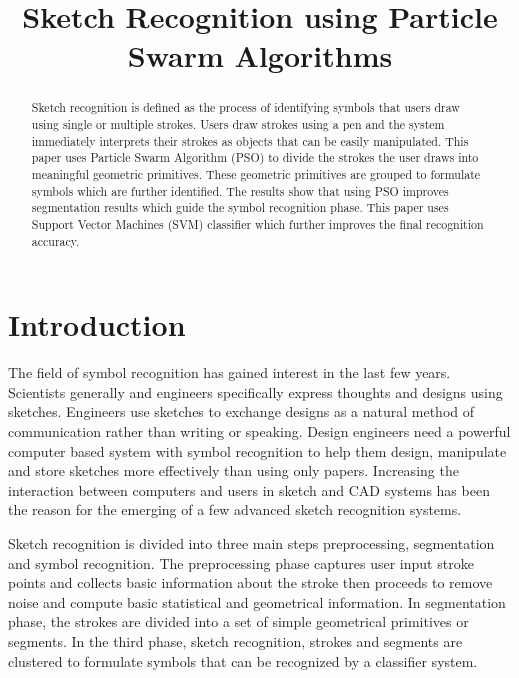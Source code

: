 \documentclass{article}
\title{Sketch Recognition using Particle Swarm Algorithms}
\begin{document}
\maketitle
\begin{abstract}
Sketch recognition is defined as the process of identifying symbols that users draw using single or multiple strokes. Users draw strokes using a pen and the system immediately interprets their strokes as objects that can be easily manipulated. This paper uses Particle Swarm Algorithm (PSO) to divide the strokes the user draws into meaningful geometric primitives. These geometric primitives are grouped to formulate symbols which are further identified. The results show that using PSO improves segmentation results which guide the symbol recognition phase. This paper uses Support Vector Machines (SVM) classifier which further improves the final recognition accuracy.  
\end{abstract}
\section{Introduction}
The field of symbol recognition has gained interest in the last few years. Scientists generally and engineers specifically express thoughts and designs using sketches. Engineers use sketches to exchange designs as a natural method of communication rather than writing or speaking. Design engineers need a powerful computer based system with symbol recognition to help them design, manipulate and store sketches more effectively than using only papers. Increasing the interaction between computers and users in sketch and CAD systems has been the reason for the emerging of a few advanced sketch recognition systems. 

Sketch recognition is divided into three main steps preprocessing, segmentation and symbol recognition. The preprocessing phase captures user input stroke points and collects basic information about the stroke then proceeds to remove noise and compute basic statistical and geometrical information. In segmentation phase, the strokes are divided into a set of simple geometrical primitives or segments. In the third phase, sketch recognition, strokes and segments are clustered to formulate symbols that can be recognized by a classifier system. 
\end{document}
